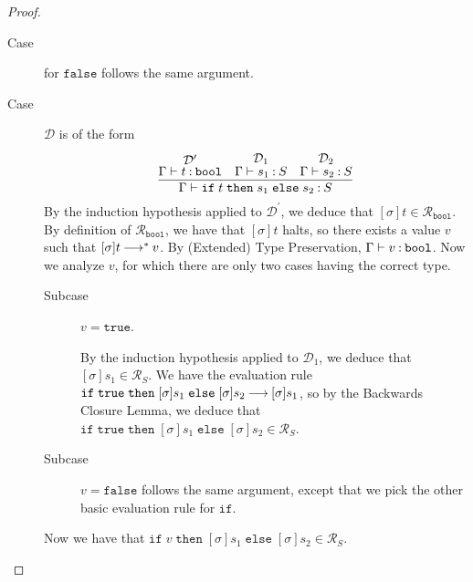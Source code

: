 \documentclass[11pt,letterpaper]{article}
\renewcommand{\R}{\mathcal{R}}
\newcommand{\bool}{\mathtt{bool}}
\newcommand{\True}{\mathtt{true}}
\newcommand{\False}{\mathtt{false}}
\newcommand{\ifthenelse}[3]{%
  \mathtt{if}\;#1\;\mathtt{then}\;#2\;\mathtt{else}\;#3%
}
\begin{document}
\begin{enumerate}
\begin{proof}
\begin{description}
        \item[Case] for $\False$ follows the same argument.

        \item[Case] $\mathcal{D}$ is of the form
          \begin{equation*}
            \infer{%
              \Gamma \proves \ifthenelse{t}{s_1}{s_2} \hastype S%
            }{%
              \deduce[\mathcal{D}^\prime]{\Gamma \proves t \hastype \bool}{}
              &
              \deduce[\mathcal{D}_1]{\Gamma \proves s_1 \hastype S}{}
              &
              \deduce[\mathcal{D}_2]{\Gamma \proves s_2 \hastype S}{}
            }
          \end{equation*}
          By the induction hypothesis applied to $\mathcal{D}^\prime$,
          we deduce that $[\sigma]t \in \R_\bool$.
          By definition of $\R_\bool$, we have that $[\sigma]t$ halts, so
          there exists a value $v$ such that $[\sigma]t \mathbin{\longrightarrow}^* v$.
          By (Extended) Type Preservation\footnotemark,
          $\Gamma \proves v \hastype \bool$.
          Now we analyze $v$, for which there are only two cases having the
          correct type.
          \begin{description}
            \item[Subcase] $v = \True$.

              By the induction hypothesis applied to $\mathcal{D}_1$,
              we deduce that $[\sigma]s_1 \in \R_S$.
              We have the evaluation rule
              $\ifthenelse{\True}{[\sigma]s_1}{[\sigma]s_2} \evalto [\sigma]s_1$,
              so by the Backwards Closure Lemma,
              we deduce that
              $\ifthenelse{\True}{[\sigma]s_1}{[\sigma]s_2} \in \R_S$.

            \item[Subcase] $v = \False$ follows the same argument, except that
              we pick the other basic evaluation rule for $\mathtt{if}$.
          \end{description}
          Now we have that
          $\ifthenelse{v}{[\sigma]s_1}{[\sigma]s_2} \in \R_S$.


\end{description}
\end{proof}
\end{enumerate}
\end{document}
